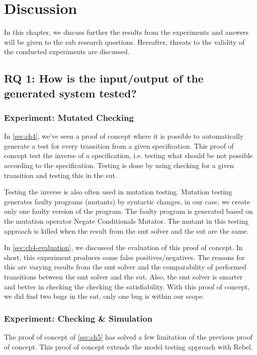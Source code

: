 \chapter{Discussion}

In this chapter, we discuss further the results from the experiments and answers will be given to the sub research questions. Hereafter, threats to the validity of the conducted experiments are discussed.

\section{RQ 1: How is the input/output of the generated system tested?}

\subsection{Experiment: Mutated Checking}
In \autoref{sec:ch4}, we've seen a proof of concept where it is possible to automatically generate a test for every transition from a given specification. This proof of concept test the inverse of a specification, i.e. testing what should be not possible according to the specification. Testing is done by using checking for a given transition and testing this in the \gls{sut}.

Testing the inverse is also often used in mutation testing. Mutation testing generates faulty programs (mutants) by syntactic changes, in our case, we create only one faulty version of the program. The faulty program is generated based on the mutation operator Negate Conditionals Mutator. The mutant in this testing approach is killed when the result from the \gls{smt} solver and the \gls{sut} are the same.

In \autoref{sec:ch4-evaluation}, we discussed the evaluation of this proof of concept. In short, this experiment produces some false positives/negatives. The reasons for this are varying results from the \gls{smt} solver and the comparability of performed transitions between the \gls{smt} solver and the \gls{sut}. Also, the \gls{smt} solver is smarter and better in checking the checking the satisfiability. With this proof of concept, we did find two bugs in the \gls{sut}, only one bug is within our scope.


\subsection{Experiment: Checking & Simulation}
The proof of concept of \autoref{sec:ch5} has solved a few limitation of the previous proof of concept. This proof of concept extends the model testing approach with Rebel.

